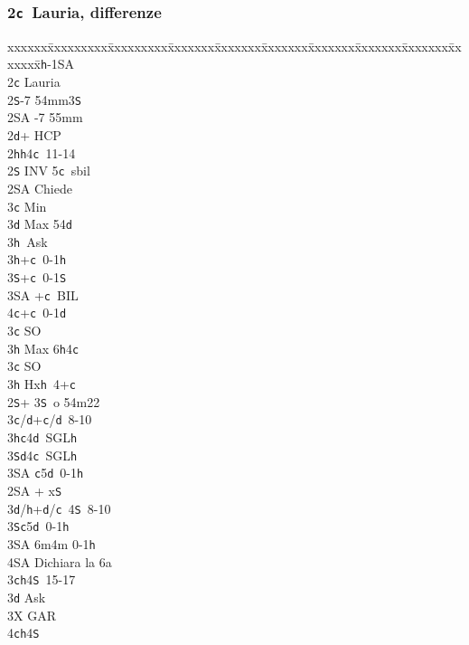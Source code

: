 \documentclass[a4paper,italian]{article}
\newcommand{\BS}{\small{\texttt{S}}}
\newcommand{\BC}{\small{\texttt{c}}}
\newcommand{\BD}{\small{\texttt{d}}}
\newcommand{\BH}{\small{\texttt{h}}}
\newcommand{\pdfc}{\texorpdfstring{\texttt{c}}{C}}
\newenvironment{bidtable}
{\begin{tabbing}

    xxxxxx\=xxxxxxxxx\=xxxxxxxxx\=xxxxxxx\=xxxxxxx\=xxxxxxx\=xxxxxxx\=xxxxxxx\=xxxxxxx\=xxxxxxx\=\kill}
{\end{tabbing} }%
\begin{document}
\begin{multicols}{2}

    \subsubsection{2\pdfc\ Lauria, differenze}\label{Lauriadiff}

    \begin{bidtable}
        1\BH-1\small{SA}\+\\
        2\BC \> Lauria\+\\
        2\BS {}-7 54mm3\BS \\
        2\small{SA} -7 55mm\\
        2\BD {}+ HCP\+\\
        2\BH {}\BH 4\BC\ 11-14\+\\
        2\BS \> INV 5\BC\ sbil\+\\
        2\small{SA} \> Chiede\+\\
        3\BC \> Min\\
        3\BD \> Max 54\BD\+\\
        3\BH\ Ask\-\\
        3\BH {}+\BC\ 0-1\BH\\
        3\BS {}+\BC\ 0-1\BS\\
        3\small{SA} +\BC\ BIL\\
        4\BC {}+\BC\ 0-1\BD\-\\
        3\BC \> SO\\
        3\BH \> Max 6\BH4\BC\-\\
        3\BC \> SO\\
        3\BH \> Hx\BH\ 4+\BC \-\\
        2\BS {}+ 3\BS\ o 54m22\+\\
        3\BC/\BD {}+\BC /\BD\ 8-10\\
        3\BH {}\BC 4\BD\ SGL\BH \\
        3\BS {}\BD 4\BC\ SGL\BH \\
        3\small{SA} \BC 5\BD\ 0-1\BH \-\\
        2\small{SA} + x\BS \+\\
        3\BD/\BH {}+\BD /\BC\ 4\BS\ 8-10\\
        3\BS {}\BC 5\BD\ 0-1\BH \\
        3\small{SA} \> 6m4m 0-1\BH \+\\
        4\small{SA} \> Dichiara la 6a\-\-\\
        3\BC {}\BH 4\BS\ 15-17\+\\
        3\BD \> Ask\+\\
        3X \> GAR\\
        4\BC {}\BH 4\BS \-\-\-\-\-
    \end{bidtable}


\end{multicols}
\end{document}
